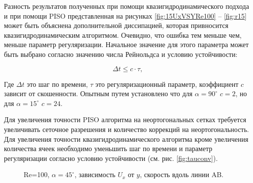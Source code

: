 Разность результатов полученных при помощи квазигидродинамического подхода и при помощи PISO представленная на рисунках \ref{fig:15UxVSYRe100} -- \ref{fig:r15} может быть объяснена дополнительной диссипацией, которая привносится квазигидродинамическим алгоритмом. Очевидно, что ошибка тем меньше чем, меньше параметр регуляризации. Начальное значение для этого параметра может быть выбрано согласно значению числа Рейнольдса и условию устойчивости:

\begin{equation}
    \Delta t \leq c \cdot \tau,
\end{equation}

Где $\Delta t$ это шаг по времени, $\tau$ это регуляризационный параметр, коэффициент $c$ зависит от скошенности. Опытным путем установлено что для $\alpha = 90^{\circ}$ $c=2$, но для $\alpha = 15^{\circ}$ $c=24$.

Для увеличения точности PISO алгоритма на неортогональных сетках требуется увеличивать сеточное разрешения и количество коррекций на неортогональность. Для увеличения точности квазигидродинамического алгоритма кроме увеличения количества ячеек необходимо уменьшить шаг по времени и параметр регуляризации согласно условию устойчивости (см. рис. \ref{fig:tauconv}). 

\begin{figure}[!ht]
    \centering
        \caption{Re=100, $\alpha = 45^\circ$, зависимость $U_x$ от $y$, скорость вдоль линии AB.}
        \label{fig:Re10045UxVSy}
\end{figure}

